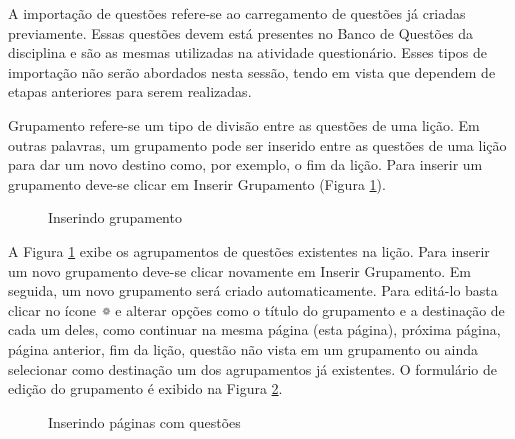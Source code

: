 A importação de questões refere-se ao carregamento de questões já criadas previamente. Essas questões devem está presentes no Banco de Questões da disciplina e são as mesmas utilizadas na atividade questionário. Esses tipos de importação não serão abordados nesta sessão, tendo em vista que dependem de etapas anteriores para serem realizadas.

Grupamento refere-se um tipo de divisão entre as questões de uma lição. Em outras palavras, um grupamento pode ser inserido entre as questões de uma lição para dar um novo destino como, por exemplo, o fim da lição. Para inserir um grupamento deve-se clicar em Inserir Grupamento (Figura \ref{fig:inserindo_grup}).

\begin{figure}
 \begin{center}
  \caption{Inserindo grupamento}
  \label{fig:inserindo_grup}
 \end{center}
\end{figure}

A Figura \ref{fig:inserindo_grup} exibe os agrupamentos de questões existentes na lição. Para inserir um novo grupamento deve-se clicar novamente em Inserir Grupamento. Em seguida, um novo grupamento será criado automaticamente. Para editá-lo basta clicar no ícone \includegraphics[width=0.02\textwidth]{imagem/cap5/fig7.jpg} e alterar opções como o título do grupamento e a destinação de cada um deles, como continuar na mesma página (esta página), próxima página, página anterior, fim da lição, questão não vista em um grupamento ou ainda selecionar como destinação um dos agrupamentos já existentes. O formulário de edição do grupamento é exibido na Figura \ref{fig:cap5_53}.

\begin{figure}[htbp]
 \begin{center}
  \caption{Inserindo páginas com questões}
  \label{fig:cap5_53}
 \end{center}
\end{figure}

